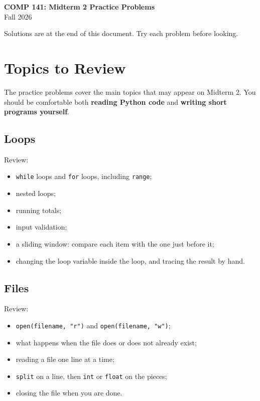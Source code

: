 \documentclass[11pt]{article}
\begin{document}
\begin{center}
    {\Large \textbf{COMP 141: Midterm 2 Practice Problems}}\\[6pt]
    Fall 2026
\end{center}

\vspace{0.15in}

Solutions are at the end of this document. Try each problem before looking.

\section*{Topics to Review}

The practice problems cover the main topics that may appear on Midterm 2.
You should be comfortable both \textbf{reading Python code} and
\textbf{writing short programs yourself}.

\subsection*{Loops}

Review:

\begin{itemize}
    \item \texttt{while} loops and \texttt{for} loops, including \texttt{range};
    \item nested loops;
    \item running totals;
    \item input validation;
    \item a sliding window: compare each item with the one just before it;
    \item changing the loop variable inside the loop, and tracing the result by hand.
\end{itemize}

\subsection*{Files}

Review:

\begin{itemize}
    \item \texttt{open(filename, "r")} and \texttt{open(filename, "w")};
    \item what happens when the file does or does not already exist;
    \item reading a file one line at a time;
    \item \texttt{split} on a line, then \texttt{int} or \texttt{float} on the pieces;
    \item closing the file when you are done.
\end{itemize}
\end{document}

